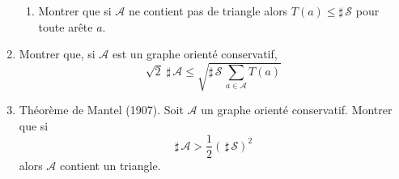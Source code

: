 \begin{enumerate}
\begin{enumerate}
\item Montrer que si $\mathcal{A}$ ne contient pas de triangle alors $T(a) \leq \sharp \, \mathcal S$ pour toute arête $a$.
\end{enumerate}

\item Montrer que, si $\mathcal A$ est un graphe orienté conservatif,
\begin{displaymath}
 \sqrt{2}\; \sharp \, \mathcal{A} \leq \sqrt{\sharp \, \mathcal{S} \,\sum_{a\in \mathcal A}T(a)}
\end{displaymath}

\item Théorème de Mantel (1907).\newline
Soit $\mathcal A$ un graphe orienté conservatif. Montrer que si
\begin{displaymath}
 \sharp \, \mathcal A > \frac{1}{2} (\,\sharp \, \mathcal S )^2
\end{displaymath}
alors $\mathcal A$ contient un triangle.
\end{enumerate}

